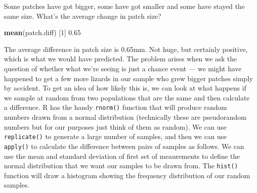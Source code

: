 \documentclass[
]{book}
\newenvironment{Shaded}{\begin{snugshade}}{\end{snugshade}}
\newcommand{\DecValTok}[1]{\textcolor[rgb]{0.00,0.00,0.81}{#1}}
\newcommand{\FloatTok}[1]{\textcolor[rgb]{0.00,0.00,0.81}{#1}}
\newcommand{\KeywordTok}[1]{\textcolor[rgb]{0.13,0.29,0.53}{\textbf{#1}}}
\newcommand{\NormalTok}[1]{#1}
\begin{document}
Some patches have got bigger, some have got smaller and some have stayed the same size. What's the average change in patch size?

\begin{Shaded}
\begin{Highlighting}[]
\KeywordTok{mean}\NormalTok{(patch.diff)}
\NormalTok{[}\DecValTok{1}\NormalTok{] }\FloatTok{0.65}
\end{Highlighting}
\end{Shaded}

The average difference in patch size is 0.65mm. Not huge, but certainly positive, which is what we would have predicted. The problem arises when we ask the question of whether what we're seeing is just a chance event --- we might have happened to get a few more lizards in our sample who grew bigger patches simply by accident. To get an idea of how likely this is, we can look at what happens if we sample at random from two populations that are the same and then calculate a difference. R has the handy \texttt{rnorm()} function that will produce random numbers drawn from a normal distribution (technically these are pseudorandom numbers but for our purposes just think of them as random). We can use \texttt{replicate()} to generate a large number of samples, and then we can use \texttt{apply()} to calculate the difference between pairs of samples as follows. We can use the mean and standard deviation of first set of meaurements to define the normal distribution that we want our samples to be drawn from. The \texttt{hist()} function will draw a histogram showing the frequency distribution of our random samples.
\end{document}
